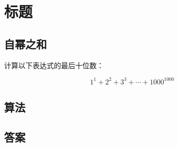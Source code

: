\section{标题}
\subsection{自幂之和}
\begin{tcolorbox}

计算以下表达式的最后十位数：

\[
1^1 + 2^2 + 3^3 + \cdots + 1000^{1000}
\]


\end{tcolorbox}

\subsection{算法}


\subsection{答案}
